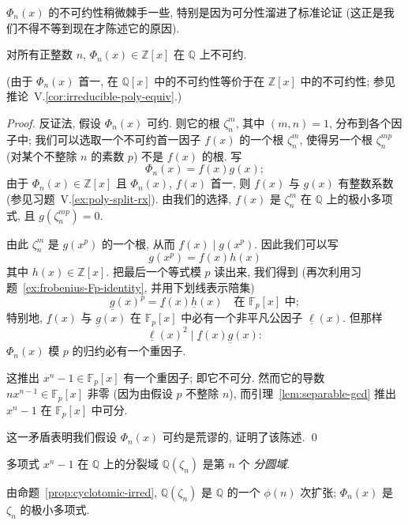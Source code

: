 $\Phi_n(x)$ 的不可约性稍微棘手一些, 特别是因为可分性溜进了标准论证 (这正是我们不得不等到现在才陈述它的原因).

\begin{proposition}\label{prop:cyclotomic-irred}
对所有正整数 $n$, $\Phi_n(x)\in\mathbb{Z}[x]$ 在 $\mathbb{Q}$ 上不可约.

(由于 $\Phi_n(x)$ 首一, 在 $\mathbb{Q}[x]$ 中的不可约性等价于在 $\mathbb{Z}[x]$ 中的不可约性; 参见推论~V.\ref{cor:irreducible-poly-equiv}.)
\end{proposition}

\begin{proof}
反证法, 假设 $\Phi_n(x)$ 可约. 则它的根 $\zeta_n^m$, 其中 $(m,n)=1$, 分布到各个因子中; 我们可以选取一个不可约首一因子 $f(x)$ 的一个根 $\zeta_n^m$, 使得另一个根 $\zeta_n^{mp}$ (对某个不整除 $n$ 的素数 $p$) 不是 $f(x)$ 的根. 写
\[
\Phi_n(x)=f(x)g(x);
\]
由于 $\Phi_n(x)\in\mathbb{Z}[x]$ 且 $\Phi_n(x)$, $f(x)$ 首一, 则 $f(x)$ 与 $g(x)$ 有整数系数 (参见习题~V.\ref{ex:poly-split-rx}). 由我们的选择, $f(x)$ 是 $\zeta_n^m$ 在 $\mathbb{Q}$ 上的极小多项式, 且 $g(\zeta_n^{mp})=0$.

由此 $\zeta_n^m$ 是 $g(x^p)$ 的一个根, 从而 $f(x)\mid g(x^p)$. 因此我们可以写
\[
g(x^p)=f(x)h(x)
\]
其中 $h(x)\in\mathbb{Z}[x]$. 把最后一个等式模 $p$ 读出来, 我们得到 (再次利用习题~\ref{ex:frobenius-Fp-identity}, 并用下划线表示陪集)
\[
\underline{g}(x)^p=\underline{f}(x)\underline{h}(x)\quad\text{在 }\mathbb{F}_p[x]\text{ 中};
\]
特别地, $\underline{f}(x)$ 与 $\underline{g}(x)$ 在 $\mathbb{F}_p[x]$ 中必有一个非平凡公因子 $\underline{\ell}(x)$. 但那样
\[
\underline{\ell}(x)^2\mid\underline{f}(x)\underline{g}(x):
\]
$\Phi_n(x)$ 模 $p$ 的归约必有一个重因子.

这推出 $x^n-1\in\mathbb{F}_p[x]$ 有一个重因子; 即它不可分. 然而它的导数 $nx^{n-1}\in\mathbb{F}_p[x]$ 非零 (因为由假设 $p$ 不整除 $n$), 而引理~\ref{lem:separable-gcd} 推出 $x^n-1$ 在 $\mathbb{F}_p[x]$ 中可分.

这一矛盾表明我们假设 $\Phi_n(x)$ 可约是荒谬的, 证明了该陈述. \qed
\end{proof}

\begin{definition}\label{def:cyclotomic-field}
多项式 $x^n-1$ 在 $\mathbb{Q}$ 上的分裂域 $\mathbb{Q}(\zeta_n)$ 是第 $n$ 个 \emph{分圆域}.
\end{definition}

由命题~\ref{prop:cyclotomic-irred}, $\mathbb{Q}(\zeta_n)$ 是 $\mathbb{Q}$ 的一个 $\phi(n)$ 次扩张; $\Phi_n(x)$ 是 $\zeta_n$ 的极小多项式.

